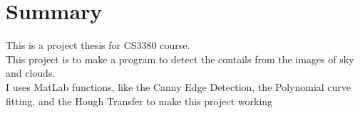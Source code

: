 

\chapter*{Summary}

This is a project thesis for CS3380 course.\\

This project is to make a program to detect the contails from the images of sky and clouds.\\

I uses MatLab functions, like the Canny Edge Detection, the Polynomial curve fitting, and the Hough Transfer to make this project working